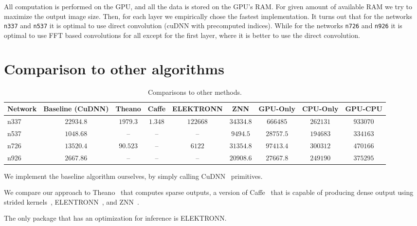 \documentclass[conference]{IEEEtran}
\begin{document}
  All computation is performed on the GPU, and all the data is stored
  on the GPU's RAM.  For given amount of available RAM we try to
  maximize the output image size.  Then, for each layer we empirically
  chose the fastest implementation.  It turns out that for the
  networks {\tt n337} and {\tt n537} it is optimal to use direct
  convolution (cuDNN with precomputed indices).  While for the
  networks {\tt n726} and {\tt n926} it is optimal to use FFT based
  convolutions for all except for the first layer, where it is better
  to use the direct convolution.

\section{Comparison to other algorithms}


  \begin{table}[t]
    \centering
    \begin{tabular}{l|cccccccc}
      \toprule
      Network  & Baseline (CuDNN)    & Theano     & Caffe    & ELEKTRONN  & ZNN        & GPU-Only   & CPU-Only   & GPU-CPU \\
      \midrule
      n337     & $22934.8$           & $1979.3$   & $1.348$  & $122668$   & $34334.8$  & $666485$   & $262131$   & $933070$ \\
      n537     & $1048.68$           & --         & --       & --         & $9494.5$   & $28757.5$  & $194683$   & $334163$ \\
      n726     & $13520.4$           & $90.523$   & --       & $6122$     & $31354.8$  & $97413.4$  & $300312$   & $470166$ \\
      n926     & $2667.86$           & --         & --       & --         & $20908.6$  & $27667.8$  & $249190$   & $375295$ \\
      \bottomrule
    \end{tabular}
    \caption{Comparisons to other methods.}
    \label{table:conv_complexity}
  \end{table}

  We implement the baseline algorithm ourselves, by simply calling
  CuDNN~\cite{chetlur2014cudnn} primitives.

  We compare our approach to Theano~\cite{bergstra2010theano} that
  computes sparse outputs, a version of Caffe~\cite{jia2014caffe} that
  is capable of producing dense output using strided
  kernels~\cite{tschopp2015efficient}, ELENTRONN~\cite{ELEKTRONN2015},
  and ZNN~\cite{zlateski2015znn}.

  The only package that has an optimization for inference is
  ELEKTRONN.




\clearpage

{\small


}
\end{document}
